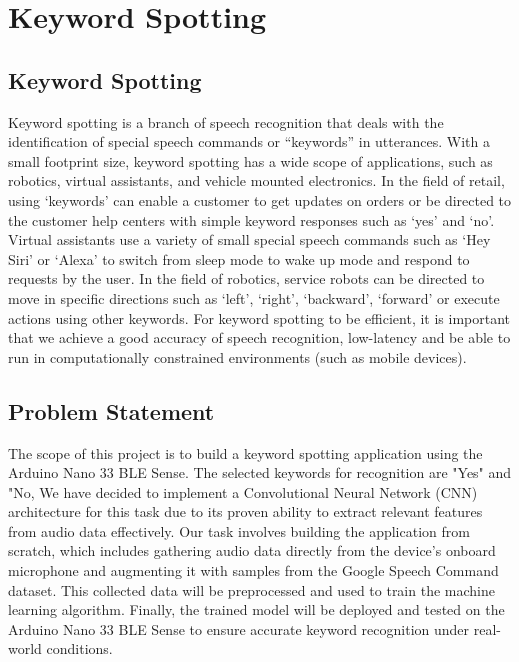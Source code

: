 %
%

\chapter{Keyword Spotting}

\section{Keyword Spotting}

Keyword spotting is a branch of speech recognition that deals with the identification of special speech commands or ``keywords'' in utterances. With a small footprint size, keyword spotting has a wide scope of applications, such as robotics, virtual assistants, and vehicle mounted electronics. In the field of retail, using ‘keywords’ can enable a customer to get updates on orders or be directed to the customer help centers with simple keyword responses such as ‘yes’ and ‘no’. Virtual assistants use a variety of small special speech commands such as ‘Hey Siri’ or ‘Alexa’ to switch from sleep mode to wake up mode and respond to requests by the user. In the field of robotics, service robots can be directed to move in specific directions such as ‘left’, ‘right’, ‘backward’, ‘forward’ or execute actions using other keywords. For keyword spotting to be efficient, it is important that we achieve a good accuracy of speech recognition, low-latency and be able to run in computationally constrained environments (such as mobile devices). \cite{rai:2023,Abbas:2023}

\section{Problem Statement}

The scope of this project is to build a keyword spotting application using the Arduino Nano 33 BLE Sense. The selected keywords for recognition are "Yes" and "No, We have decided to implement a Convolutional Neural Network (CNN) architecture for this task due to its proven ability to extract relevant features from audio data effectively.
Our task involves building the application from scratch, which includes gathering audio data directly from the device's onboard microphone and augmenting it with samples from the Google Speech Command dataset. This collected data will be preprocessed and used to train the machine learning algorithm. Finally, the trained model will be deployed and tested on the Arduino Nano 33 BLE Sense to ensure accurate keyword recognition under real-world conditions.

